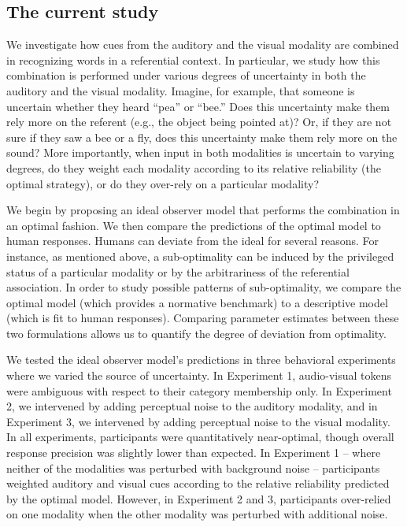 \documentclass[english,,man,floatsintext]{apa6}
\theoremstyle{definition}
\theoremstyle{definition}
\theoremstyle{definition}
\theoremstyle{remark}
\begin{document}
\subsection{The current study}\label{the-current-study}

We investigate how cues from the auditory and the visual modality are
combined in recognizing words in a referential context. In particular,
we study how this combination is performed under various degrees of
uncertainty in both the auditory and the visual modality. Imagine, for
example, that someone is uncertain whether they heard \enquote{pea} or
\enquote{bee.} Does this uncertainty make them rely more on the referent
(e.g., the object being pointed at)? Or, if they are not sure if they
saw a bee or a fly, does this uncertainty make them rely more on the
sound? More importantly, when input in both modalities is uncertain to
varying degrees, do they weight each modality according to its relative
reliability (the optimal strategy), or do they over-rely on a particular
modality?

We begin by proposing an ideal observer model that performs the
combination in an optimal fashion. We then compare the predictions of
the optimal model to human responses. Humans can deviate from the ideal
for several reasons. For instance, as mentioned above, a sub-optimality
can be induced by the privileged status of a particular modality or by
the arbitrariness of the referential association. In order to study
possible patterns of sub-optimality, we compare the optimal model (which
provides a normative benchmark) to a descriptive model (which is fit to
human responses). Comparing parameter estimates between these two
formulations allows us to quantify the degree of deviation from
optimality.

We tested the ideal observer model's predictions in three behavioral
experiments where we varied the source of uncertainty. In Experiment 1,
audio-visual tokens were ambiguous with respect to their category
membership only. In Experiment 2, we intervened by adding perceptual
noise to the auditory modality, and in Experiment 3, we intervened by
adding perceptual noise to the visual modality. In all experiments,
participants were quantitatively near-optimal, though overall response
precision was slightly lower than expected. In Experiment 1 -- where
neither of the modalities was perturbed with background noise --
participants weighted auditory and visual cues according to the relative
reliability predicted by the optimal model. However, in Experiment 2 and
3, participants over-relied on one modality when the other modality was
perturbed with additional noise.
\end{document}
